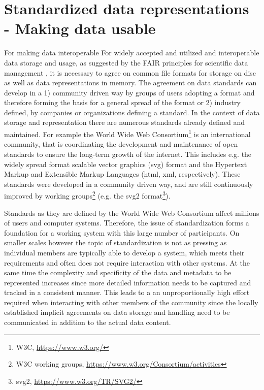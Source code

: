 \clearpage
\chapter[Data representation]{Standardized data representations\\- Making data usable}
\label{sec:neo}
For making data interoperable 
For widely accepted and utilized and interoperable data storage and usage, as suggested by the FAIR principles for scientific data management \citep{Wilkinson_2016}, it is necessary to agree on common file formats for storage on disc as well as data representations in memory. The agreement on data standards can develop in a 1) community driven way by groups of users adopting a format and therefore forming the basis for a general spread of the format or 2) industry defined, by companies or organizations defining a standard. In the context of data storage and representation there are numerous standards already defined and maintained. For example the World Wide Web Consortium\footnote{W3C, \url{https://www.w3.org/}} is an international community, that is coordinating the development and maintenance of open standards to ensure the long-term growth of the internet. This includes e.g. the widely spread format scalable vector graphics (svg) format and the Hypertext Markup and Extensible Markup Languages (html, xml, respectively). These standards were developed in a community driven way, and are still continuously improved by working groups\footnote{W3C working groups, \url{https://www.w3.org/Consortium/activities}} (e.g. the svg2 format\footnote{svg2, \url{https://www.w3.org/TR/SVG2/}}).


Standards as they are defined by the World Wide Web Consortium affect millions of users and computer systems. Therefore, the issue of standardization forms a foundation for a working system with this large number of participants. On smaller scales however the topic of standardization is not as pressing as individual members are typically able to develop a system, which meets their requirements and often does not require interaction with other systems. At the same time the complexity and specificity of the data and metadata to be represented increases since more detailed information needs to be captured and tracked in a consistent manner. This leads to a an unproportionally high effort required when interacting with other members of the community since the locally established implicit agreements on data storage and handling need to be communicated in addition to the actual data content.

